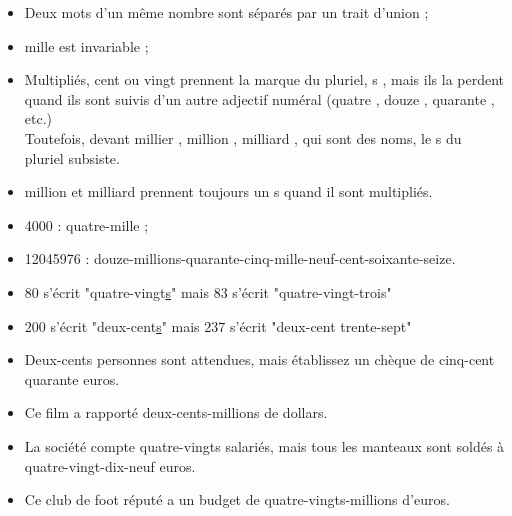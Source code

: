 \begin{propriete}   
   \begin{itemize}
      \item Deux mots d'un même nombre sont séparés par un trait d'union ;
      \item \og mille \fg est invariable ;
      \item Multipliés, \og cent \fg ou \og vingt \fg prennent la marque du pluriel, \og s \fg, mais ils la perdent quand ils sont suivis d’un autre adjectif numéral (\og quatre \fg, \og douze \fg, \og quarante \fg, etc.)\\
      Toutefois, devant \og millier \fg, \og million \fg, \og milliard \fg, qui sont des noms, le \og s \fg du pluriel subsiste.
      \item \og million \fg et \og milliard \fg prennent toujours un \og s \fg{} quand il sont multipliés.
   \end{itemize}
\end{propriete}

\begin{exemple*1}
    \begin{itemize}
        \item \num{4000} : quatre-mille ;        
        \item \num{12045976} : douze-millions-quarante-cinq-mille-neuf-cent-soixante-seize.
        \item $80$ s'écrit "quatre-vingt\underline{s}" mais $83$ s'écrit "quatre-vingt-trois"
        \item $200$ s'écrit "deux-cent\underline{s}" mais $237$ s'écrit "deux-cent trente-sept"
        \item Deux-cents personnes sont attendues, mais établissez un chèque de cinq-cent quarante euros.
        \item Ce film a rapporté deux-cents-millions de dollars.
        \item La société compte quatre-vingts salariés, mais tous les manteaux sont soldés à quatre-vingt-dix-neuf euros.
        \item Ce club de foot réputé a un budget de quatre-vingts-millions d’euros.
    \end{itemize}
\end{exemple*1}